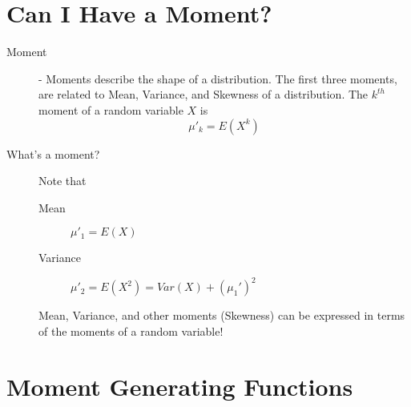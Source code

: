 \documentclass[11pt]{article}
\begin{document}
\section*{Can I Have a Moment?}
\begin{description}
\item[Moment] - Moments describe the shape of a distribution. The first three moments, are related to Mean, Variance, and Skewness of a distribution. The $k^{th}$ moment of a random variable $X$ is
  \[\mu'_k = E(X^k)\]
\item[What's a moment?] Note that
  \begin{description}
    \item[Mean] $\mu'_1 = E(X)$
    \item[Variance] $\mu'_2 = E(X^2) = Var(X) + (\mu_1')^2$
  \end{description}
  Mean, Variance, and other moments (Skewness) can be expressed in terms of the moments of a random variable!
\end{description}

\section*{Moment Generating Functions}
\end{document}
